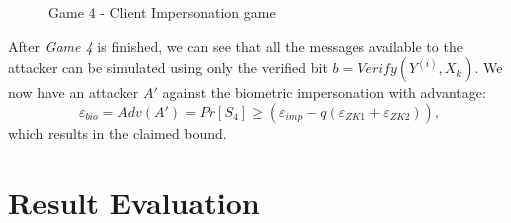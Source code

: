 \begin{figure}[htbp!] 
  \centering
  \caption{Game 4 - Client Impersonation game}
  \label{fig:game3protocol1client}
\end{figure}
After \textit{Game 4} is finished, we can see that all the messages available to the attacker can be simulated using only the verified bit $b = Verify(Y^{(i)},
X_k)$. We now have an attacker $A'$ against the biometric impersonation with
advantage:
\[
\varepsilon_{bio} = Adv(A') = Pr[S_4] \geq (\varepsilon_{imp} - q(\varepsilon_{ZK1}+\varepsilon_{ZK2})) ,
\]
which results in the claimed bound.


\section{Result Evaluation}

